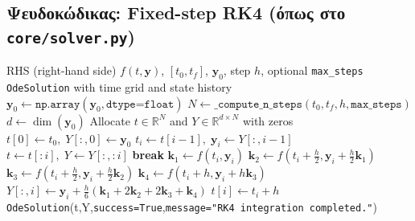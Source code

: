 \documentclass[11pt,a4paper]{report}
\begin{document}
\subsection*{Ψευδοκώδικας: Fixed-step RK4 (όπως στο \texttt{core/solver.py})}
\begin{algorithm}[H]
\caption{\texttt{integrate\_system\_rk4}}
\label{alg:rk4-fixed}
\begin{tcolorbox}[appendixalgobox]
\begin{algorithmic}[1]
\Require RHS (right-hand side) $f(t,\mathbf{y})$, $[t_0,t_f]$, $\mathbf{y}_0$, step $h$, optional \texttt{max\_steps}
\Ensure \texttt{OdeSolution} with time grid and state history
\State $\mathbf{y}_0 \gets \texttt{np.array}(\mathbf{y}_0,\texttt{dtype=float})$
\State $N \gets \texttt{\_compute\_n\_steps}(t_0,t_f,h,\texttt{max\_steps})$
\State $d \gets \dim(\mathbf{y}_0)$
\State Allocate $t \in \mathbb{R}^{N}$ and $Y \in \mathbb{R}^{d\times N}$ with zeros
\State $t[0]\gets t_0,\; Y[:,0]\gets \mathbf{y}_0$
  \State $t_i \gets t[i-1],\; \mathbf{y}_i \gets Y[:,i-1]$
    \State $t \gets t[:i],\; Y \gets Y[:,:i]$
    \State \textbf{break}
  \EndIf
  \State $\mathbf{k}_1 \gets f(t_i,\mathbf{y}_i)$
  \State $\mathbf{k}_2 \gets f(t_i+\tfrac{h}{2},\mathbf{y}_i+\tfrac{h}{2}\mathbf{k}_1)$
  \State $\mathbf{k}_3 \gets f(t_i+\tfrac{h}{2},\mathbf{y}_i+\tfrac{h}{2}\mathbf{k}_2)$
  \State $\mathbf{k}_4 \gets f(t_i+h,\mathbf{y}_i+h\mathbf{k}_3)$
  \State $Y[:,i] \gets \mathbf{y}_i + \tfrac{h}{6}\left(\mathbf{k}_1 + 2\mathbf{k}_2 + 2\mathbf{k}_3 + \mathbf{k}_4\right)$
  \State $t[i] \gets t_i + h$
\EndFor
\State \Return \texttt{OdeSolution}(t,Y,\texttt{success=True},\texttt{message="RK4 integration completed."})
\end{algorithmic}
\end{tcolorbox}
\end{algorithm}
\end{document}
